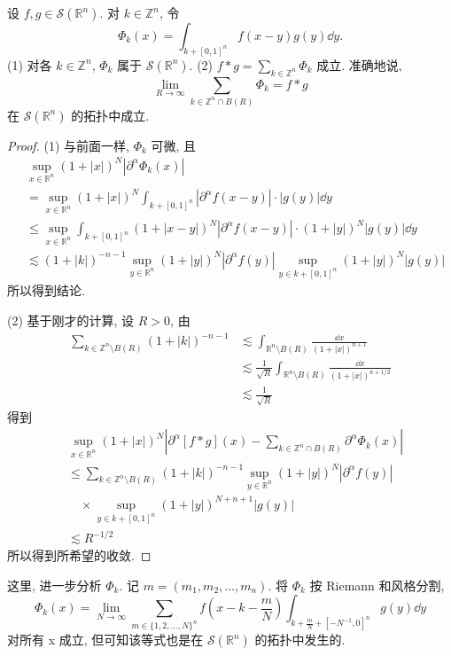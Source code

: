 \begin{lemma}\label{lem:5.1}
设 $f, g \in \mathcal{S}(\mathbb{R}^{n})$. 对 $k \in \mathbb{Z}^{n}$, 令
\[
\Phi_{k}(x) = \int_{k+[0,1]^{n}}f(x-y)g(y)\dd y.
\]
(1) 对各 $k \in \mathbb{Z}^{n}$, $\Phi_{k}$ 属于 $\mathcal{S}(\mathbb{R}^{n})$.
(2) $f * g = \sum_{k \in \mathbb{Z}^{n}}\Phi_{k}$ 成立. 准确地说,
\[
\lim_{R \to \infty}\sum_{k \in \mathbb{Z}^{n} \cap B(R)}\Phi_{k} = f * g
\]
在 $\mathcal{S}(\mathbb{R}^{n})$ 的拓扑中成立.
\end{lemma}

\begin{proof}
(1) 与前面一样, $\Phi_{k}$ 可微, 且
\begin{align*}
&\sup_{x \in \mathbb{R}^{n}}(1+|x|)^{N}|\partial^{\alpha}\Phi_{k}(x)| \\
&= \sup_{x \in \mathbb{R}^{n}}(1+|x|)^{N}\int_{k+[0,1]^{n}}|\partial^{\alpha}f(x-y)| \cdot |g(y)|\dd y \\
&\leq \sup_{x \in \mathbb{R}^{n}}\int_{k+[0,1]^{n}}(1+|x-y|)^{N}|\partial^{\alpha}f(x-y)| \cdot (1+|y|)^{N}|g(y)|\dd y \\
&\lesssim (1+|k|)^{-n-1}\sup_{y \in \mathbb{R}^{n}}(1+|y|)^{N}|\partial^{\alpha}f(y)|\sup_{y \in k+[0,1]^{n}}(1+|y|)^{N}|g(y)|
\end{align*}
所以得到结论.

(2) 基于刚才的计算, 设 $R > 0$, 由
\begin{align*}
\sum_{k \in \mathbb{Z}^{n}\setminus B(R)}(1+|k|)^{-n-1} &\lesssim \int_{\mathbb{R}^{n}\setminus B(R)}\frac{\dd x}{(1+|x|)^{n+1}} \\
&\lesssim \frac{1}{\sqrt{R}}\int_{\mathbb{R}^{n}\setminus B(R)}\frac{\dd x}{(1+|x|)^{n+1/2}} \\
&\lesssim \frac{1}{\sqrt{R}}
\end{align*}
得到
\begin{align*}
&\sup_{x \in \mathbb{R}^{n}}(1+|x|)^{N}\left|\partial^{\alpha}[f*g](x) - \sum_{k \in \mathbb{Z}^{n} \cap B(R)}\partial^{\alpha}\Phi_{k}(x)\right| \\
&\leq \sum_{k \in \mathbb{Z}^{n}\setminus B(R)}(1+|k|)^{-n-1}\sup_{y \in \mathbb{R}^{n}}(1+|y|)^{N}|\partial^{\alpha}f(y)| \\
&\quad \times \sup_{y \in k+[0,1]^{n}}(1+|y|)^{N+n+1}|g(y)| \\
&\lesssim R^{-1/2}
\end{align*}
所以得到所希望的收敛.
\end{proof}

这里, 进一步分析 $\Phi_{k}$. 记 $m = (m_{1}, m_{2}, \ldots, m_{n})$. 将 $\Phi_{k}$ 按 Riemann 和风格分割,
\[
\Phi_{k}(x) = \lim_{N \to \infty}\sum_{m \in \{1, 2, \ldots, N\}^{n}}f\left(x - k - \frac{m}{N}\right)\int_{k+\frac{m}{N}+[-N^{-1},0]^{n}}g(y)\dd y
\]
对所有 x 成立, 但可知该等式也是在 $\mathcal{S}(\mathbb{R}^{n})$ 的拓扑中发生的.

